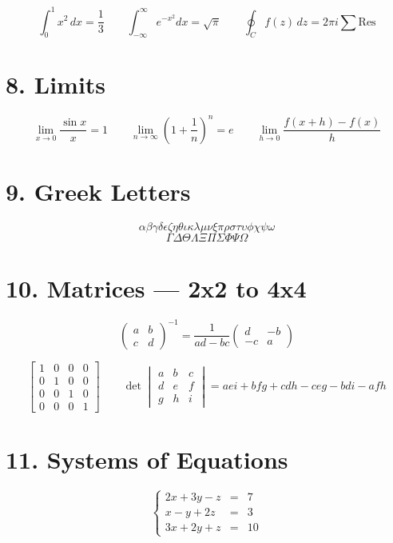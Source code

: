 \documentclass{article}
\begin{document}
\[ \int_0^1 x^2 \, dx = \frac{1}{3} \qquad \int_{-\infty}^{\infty} e^{-x^2} dx = \sqrt{\pi} \qquad \oint_C f(z) \, dz = 2\pi i \sum \text{Res} \]

\section*{8. Limits}

\[ \lim_{x \to 0} \frac{\sin x}{x} = 1 \qquad \lim_{n \to \infty} \left(1 + \frac{1}{n}\right)^n = e \qquad \lim_{h \to 0} \frac{f(x+h) - f(x)}{h} \]

\section*{9. Greek Letters}

\[ \alpha \beta \gamma \delta \epsilon \zeta \eta \theta \iota \kappa \lambda \mu \nu \xi \pi \rho \sigma \tau \upsilon \phi \chi \psi \omega \]
\[ \Gamma \Delta \Theta \Lambda \Xi \Pi \Sigma \Phi \Psi \Omega \]

\section*{10. Matrices --- 2x2 to 4x4}

\[
\begin{pmatrix} a & b \\ c & d \end{pmatrix}^{-1} = \frac{1}{ad-bc} \begin{pmatrix} d & -b \\ -c & a \end{pmatrix}
\]

\[
\begin{bmatrix} 1 & 0 & 0 & 0 \\ 0 & 1 & 0 & 0 \\ 0 & 0 & 1 & 0 \\ 0 & 0 & 0 & 1 \end{bmatrix}
\qquad
\det \begin{vmatrix} a & b & c \\ d & e & f \\ g & h & i \end{vmatrix} = aei + bfg + cdh - ceg - bdi - afh
\]

\section*{11. Systems of Equations}

\[
\left\{
\begin{array}{rcl}
2x + 3y - z &=& 7 \\
x - y + 2z &=& 3 \\
3x + 2y + z &=& 10
\end{array}
\right.
\]
\end{document}
